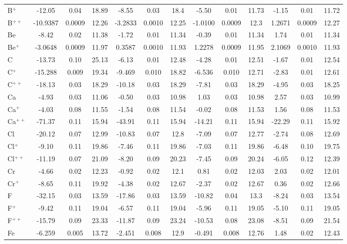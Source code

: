 \begin{longtable}{l!{\vrule width 0.25pt}ccc!{\vrule width 0.25pt}ccc!{\vrule width 0.25pt}ccc!{\vrule width 0.25pt}ccc}
B$^+$ & -12.05 & 0.04 & 18.89 & -8.55 & 0.03 & 18.4 & -5.50 & 0.01 & 11.73 & -1.15 & 0.01 & 11.72 \\
B$^{++}$ & -10.9387 & 0.0009 & 12.26 & -3.2833 & 0.0010 & 12.25 & -1.0100 & 0.0009 & 12.3 & 1.2671 & 0.0009 & 12.27 \\
Be & -8.42 & 0.02 & 11.38 & -1.72 & 0.01 & 11.34 & -0.39 & 0.01 & 11.34 & 1.74 & 0.01 & 11.34 \\
Be$^+$ & -3.0648 & 0.0009 & 11.97 & 0.3587 & 0.0010 & 11.93 & 1.2278 & 0.0009 & 11.95 & 2.1069 & 0.0010 & 11.93 \\
C & -13.73 & 0.10 & 25.13 & -6.13 & 0.01 & 12.48 & -4.28 & 0.01 & 12.51 & -1.67 & 0.01 & 12.54 \\
C$^+$ & -15.288 & 0.009 & 19.34 & -9.469 & 0.010 & 18.82 & -6.536 & 0.010 & 12.71 & -2.83 & 0.01 & 12.61 \\
C$^{++}$ & -18.13 & 0.03 & 18.29 & -10.18 & 0.03 & 18.29 & -7.81 & 0.03 & 18.29 & -4.95 & 0.03 & 18.25 \\
Ca & -4.93 & 0.03 & 11.06 & -0.50 & 0.03 & 10.98 & 1.03 & 0.03 & 10.98 & 2.57 & 0.03 & 10.99 \\
Ca$^+$ & -4.03 & 0.08 & 11.55 & -1.54 & 0.08 & 11.54 & -0.02 & 0.08 & 11.53 & 1.56 & 0.08 & 11.53 \\
Ca$^{++}$ & -71.37 & 0.11 & 15.94 & -43.91 & 0.11 & 15.94 & -14.21 & 0.11 & 15.94 & -22.29 & 0.11 & 15.92 \\
Cl & -20.12 & 0.07 & 12.99 & -10.83 & 0.07 & 12.8 & -7.09 & 0.07 & 12.77 & -2.74 & 0.08 & 12.69 \\
Cl$^+$ & -9.10 & 0.11 & 19.86 & -7.46 & 0.11 & 19.86 & -7.03 & 0.11 & 19.86 & -6.48 & 0.10 & 19.75 \\
Cl$^{++}$ & -11.19 & 0.07 & 21.09 & -8.20 & 0.09 & 20.23 & -7.45 & 0.09 & 20.24 & -6.05 & 0.12 & 12.39 \\
Cr & -4.66 & 0.02 & 12.23 & -0.92 & 0.02 & 12.1 & 0.81 & 0.02 & 12.03 & 2.03 & 0.02 & 12.01 \\
Cr$^+$ & -8.65 & 0.11 & 19.92 & -4.38 & 0.02 & 12.67 & -2.37 & 0.02 & 12.67 & 0.36 & 0.02 & 12.66 \\
F & -32.15 & 0.03 & 13.59 & -17.86 & 0.03 & 13.59 & -10.82 & 0.04 & 13.3 & -8.24 & 0.03 & 13.54 \\
F$^+$ & -9.42 & 0.11 & 19.04 & -6.57 & 0.11 & 19.04 & -5.96 & 0.11 & 19.05 & -5.10 & 0.11 & 19.05 \\
F$^{++}$ & -15.79 & 0.09 & 23.33 & -11.87 & 0.09 & 23.24 & -10.53 & 0.08 & 23.08 & -8.51 & 0.09 & 21.54 \\
Fe & -6.259 & 0.005 & 13.72 & -2.451 & 0.008 & 12.9 & -0.491 & 0.008 & 12.76 & 1.48 & 0.02 & 12.43 \\

\end{longtable}
